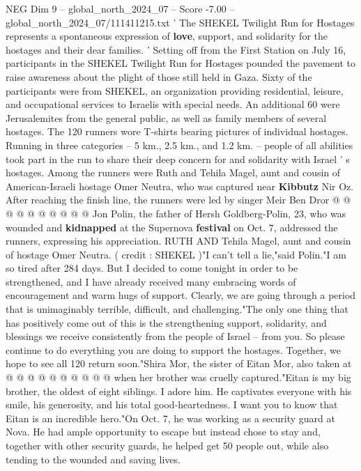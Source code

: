 \begin{textsample}{NEG Dim 9 – global\_north\_2024\_07 – Score -7.00 – global\_north\_2024\_07/111411215.txt}  \label{ex:f9_neg_157}
' The SHEKEL Twilight Run for Hostages represents a spontaneous expression of \textbf{love}, support, and solidarity for the hostages and their dear families. ' Setting off from the First Station on July 16, participants in the SHEKEL Twilight Run for Hostages pounded the pavement to raise awareness about the plight of those still held in Gaza.
Sixty of the participants were from SHEKEL, an organization providing residential, leisure, and occupational services to Israelis with special needs.
An additional 60 were Jerusalemites from the general public, as well as family members of several hostages.
The 120 runners wore T-shirts bearing pictures of individual hostages.
Running in three categories -- 5 km., 2.5 km., and 1.2 km. -- people of all abilities took part in the run to share their deep concern for and solidarity with Israel ' s hostages.
Among the runners were Ruth and Tehila Magel, aunt and cousin of American-Israeli hostage Omer Neutra, who was captured near \textbf{Kibbutz} Nir Oz.
After reaching the finish line, the runners were led by singer Meir Ben Dror @ @ @ @ @ @ @ @ @ @ Jon Polin, the father of Hersh Goldberg-Polin, 23, who was wounded and \textbf{kidnapped} at the Supernova \textbf{festival} on Oct. 7, addressed the runners, expressing his appreciation.
RUTH AND Tehila Magel, aunt and cousin of hostage Omer Neutra. ( credit : SHEKEL )"I can't tell a lie,"said Polin."I am so tired after 284 days.
But I decided to come tonight in order to be strengthened, and I have already received many embracing words of encouragement and warm hugs of support.
Clearly, we are going through a period that is unimaginably terrible, difficult, and challenging."The only one thing that has positively come out of this is the strengthening support, solidarity, and blessings we receive consistently from the people of Israel -- from you.
So please continue to do everything you are doing to support the hostages.
Together, we hope to see all 120 return soon."Shira Mor, the sister of Eitan Mor, also taken at @ @ @ @ @ @ @ @ @ @ when her brother was cruelly captured."Eitan is my big brother, the oldest of eight siblings.
I adore him.
He captivates everyone with his smile, his generosity, and his total good-heartedness.
I want you to know that Eitan is an incredible hero."On Oct. 7, he was working as a security guard at Nova.
He had ample opportunity to escape but instead chose to stay and, together with other security guards, he helped get 50 people out, while also tending to the wounded and saving lives.

\end{textsample}
